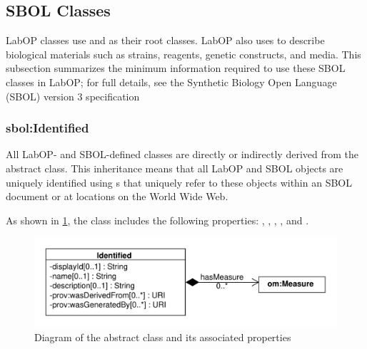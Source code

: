 \subsection{SBOL Classes}

LabOP classes use  and  as their root classes.
LabOP also uses  to describe biological materials such as strains, reagents, genetic constructs, and media.
This subsection summarizes the minimum information required to use these SBOL classes in LabOP; for full details, see the Synthetic Biology Open Language (SBOL) version 3 specification~\citep{SBOL3}

\subsubsection{sbol:Identified}
\label{sec:sbol:Identified}

All LabOP- and SBOL-defined classes are directly or indirectly derived from the   abstract class.
This inheritance means that all LabOP and SBOL objects are uniquely identified using s that uniquely refer to these objects within an SBOL document or at locations on the World Wide Web.

As shown in \ref{uml:identified}, the  class includes the following properties: ,  , , , and . 

\begin{figure}[ht]
\begin{center}
\includegraphics[scale=0.6]{sbol_classes/identified}
\caption[]{Diagram of the  abstract class and its associated properties}
\label{uml:identified}
\end{center}
\end{figure}

